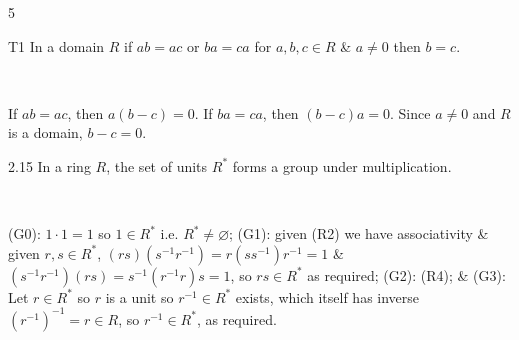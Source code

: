 \documentclass[8pt]{extarticle}
\makeatletter
\renewenvironment{proof}[1][\proofname]{%
  \par\noindent
  \pushQED{\qed}%
  \normalfont\itshape #1\@addpunct{.}\ \normalfont\ignorespaces
}{%
  \popQED%
  \par
}
\makeatother
\begin{document}
\begin{multicols}{5}
        \begin{proposition}{T1}
            In a domain \(R\) if \(ab=ac\) or \(ba=ca\) for \(a,b,c\in R\) \& \(a\ne0\) then \(b=c\).
        \end{proposition}

        \begin{proof}
            If \(ab=ac\), then \(a(b-c)=0\). If \(ba=ca\), then \((b-c)a=0\). Since \(a\ne0\) and \(R\) is a domain, \(b-c=0\).        
        \end{proof}

        \begin{lemma}{2.15}
            In a ring \(R\), the set of units \(R^*\) forms a group under multiplication.
        \end{lemma}

        \begin{proof}
            (G0): \(1\cdot1=1\) so \(1\in R^*\) i.e. \(R^*\ne\varnothing\); (G1): given (R2) we have associativity \& given \(r,s\in R^*\), \((rs)(s^{-1}r^{-1})=r(ss^{-1})r^{-1}=1\) \&
            \((s^{-1}r^{-1})(rs)=s^{-1}(r^{-1}r)s=1\), so \(rs\in R^*\) as required; (G2): (R4); \& (G3): Let \(r\in R^*\) so \(r\) is a unit so \(r^{-1}\in R^*\) exists, which itself has inverse \((r^{-1})^{-1}=r\in R\), so \(r^{-1}\in R^*\), as required.

        \end{proof}

        \vspace{-2pt}
        \noindent{}
\end{multicols}
\end{document}
